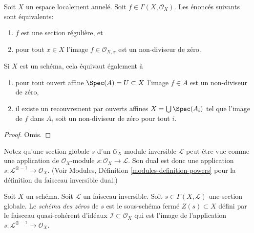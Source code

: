\begin{lemma}
\label{lemma-regular-section-structure-sheaf}
Soit  $X$  un espace localement annelé. Soit  $f \in \Gamma(X, \mathcal{O}_X)$. Les énoncés
suivants sont équivalents:
\begin{enumerate}
\item $f$  est une section régulière, et
\item pour tout  $x \in X$  l'image  $f \in \mathcal{O}_{X, x}$  est un non-diviseur de zéro.
\end{enumerate}
Si  $X$  est un schéma, cela équivaut également à
\begin{enumerate}
\item[(3)] pour tout ouvert affine  $\Spec(A) = U \subset X$  l'image  $f \in A$  est un non-diviseur de
zéro,
\item[(4)] il existe un recouvrement par ouverts affines  $X = \bigcup \Spec(A_i)$  tel que l'image de
 $f$  dans  $A_i$  soit un non-diviseur de zéro pour tout
 $i$.
\end{enumerate}
\end{lemma}

\begin{proof}
Omis.
\end{proof}

\noindent
Notez qu'une section globale  $s$  d'un  $\mathcal{O}_X$-module inversible
 $\mathcal{L}$  peut être vue comme une application de  $\mathcal{O}_X$-module
 $s : \mathcal{O}_X \to \mathcal{L}$. Son dual est donc une application  $s : \mathcal{L}^{\otimes -1} \to \mathcal{O}_X$. (Voir Modules,
Définition  \ref{modules-definition-powers}  pour la définition du faisceau inversible dual.)

\begin{definition}
\label{definition-zero-scheme-s}
Soit  $X$  un schéma. Soit  $\mathcal{L}$  un faisceau inversible. Soit
 $s \in \Gamma(X, \mathcal{L})$  une section globale. Le  {\it  schéma des
zéros}  de  $s$  est le sous-schéma fermé  $Z(s) \subset X$  défini par
le faisceau quasi-cohérent d'idéaux  $\mathcal{I} \subset \mathcal{O}_X$  qui est l'image de l'application
 $s : \mathcal{L}^{\otimes -1} \to \mathcal{O}_X$.
\end{definition}


